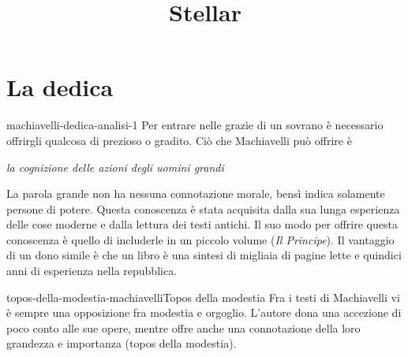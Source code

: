 \documentclass[preview]{standalone}
\begin{document}
\title{Stellar}
\genpage

\section{La dedica}

\begin{snippet}{machiavelli-dedica-analisi-1}
    Per entrare nelle grazie di un sovrano è necessario offrirgli qualcosa di prezioso o gradito.
    Ciò che Machiavelli può offrire è
    \begin{center}
        \textit{la cognizione delle azioni degli uomini grandi}
    \end{center}
    La parola grande non ha nessuna connotazione morale, bensì indica solamente
    persone di potere.
    Questa conoscenza è stata acquisita dalla sua lunga esperienza delle cose moderne
    e dalla lettura dei testi antichi.
    Il suo modo per offrire questa conoscenza è quello di includerle in un piccolo volume (\textit{Il Principe}).
    Il vantaggio di un dono simile è che un libro è una sintesi di migliaia di pagine
    lette e quindici anni di esperienza nella repubblica.
\end{snippet}

\begin{snippetnote}{topos-della-modestia-machiavelli}{Topos della modestia}
    Fra i testi di Machiavelli vi è sempre una opposizione fra modestia e orgoglio.
    L'autore dona una accezione di poco conto alle sue opere, mentre
    offre anche una connotazione della loro grandezza e importanza (topos della modestia).
\end{snippetnote}
\end{document}
